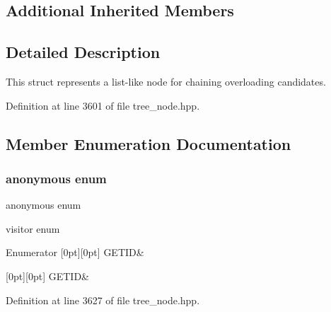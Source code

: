 \subsection*{Additional Inherited Members}


\subsection{Detailed Description}
This struct represents a list-\/like node for chaining overloading candidates. 

Definition at line 3601 of file tree\+\_\+node.\+hpp.



\subsection{Member Enumeration Documentation}
\mbox{\label{structoverload_afce9f273a323f9fd962ddcf72f73ebfa}} 
\subsubsection{\texorpdfstring{anonymous enum}{anonymous enum}}
{\footnotesize\ttfamily anonymous enum}



visitor enum 

\begin{DoxyEnumFields}{Enumerator}
[0pt][0pt]{}\mbox{\label{structoverload_afce9f273a323f9fd962ddcf72f73ebfaa69dc515d3ba48e97f3581e32cd512f52}} 
G\+E\+T\+ID&\\
\hline

[0pt][0pt]{}\mbox{\label{structoverload_afce9f273a323f9fd962ddcf72f73ebfaa69dc515d3ba48e97f3581e32cd512f52}} 
G\+E\+T\+ID&\\
\hline

\end{DoxyEnumFields}


Definition at line 3627 of file tree\+\_\+node.\+hpp.



